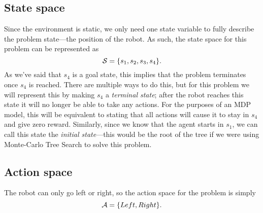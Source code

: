 \documentclass[a4paper]{article}
\begin{document}
\subsection{State space}
Since the environment is static, we only need one state variable to fully
describe the problem state---the position of the robot.
As such, the state space for this problem can be represented as
\begin{equation*}
  \mathcal{S} = \{s_1, s_2, s_3, s_4\} .
\end{equation*}
As we've said that $s_4$ is a goal state, this implies that the
problem terminates once $s_4$ is reached.
There are multiple ways to do this, but for this problem we will represent
this by making $s_4$ a \emph{terminal state};
after the robot reaches this state it will no longer be able to take any
actions.
For the purposes of an MDP model, this will be equivalent to stating that
all actions will cause it to stay in $s_4$ and give zero reward.
Similarly, since we know that the agent starts in $s_1$, we can call
this state the \emph{initial state}---this would be the root of the tree
if we were using Monte-Carlo Tree Search to solve this problem.

\subsection{Action space}
The robot can only go left or right, so the action space for the problem is
simply
\begin{equation*}
  \mathcal{A} = \{ Left, Right \} .
\end{equation*}
\end{document}
